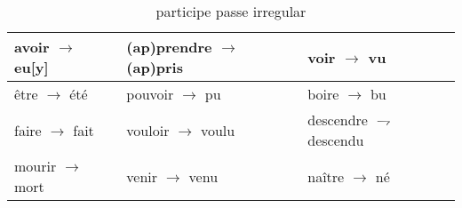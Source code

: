 \documentclass[math,code]{amznotes}
\theoremstyle{remark}
\begin{document}
\begin{enumerate}
\begin{table}[h]
        \centering
        \begin{tabular}{|l|l|l|}
        \hline
        avoir $\rightarrow$ eu{[}y{]} & (ap)prendre $\rightarrow$ (ap)pris & voir $\rightarrow$ vu  \\ \hline
        être $\rightarrow$ été        & pouvoir $\rightarrow$ pu           & boire $\rightarrow$ bu \\ \hline
        faire $\rightarrow$ fait      & vouloir $\rightarrow$ voulu        & descendre $\rightharpoondown$ descendu        \\ \hline
        mourir $\rightarrow$ mort     & venir $\rightarrow$ venu           & naître $\rightarrow$ né \\ \hline
        \end{tabular}
        \caption{participe passe irregular}
        \label{tab:participe-passe-irregular}
    \end{table}
\end{enumerate}
\end{document}
